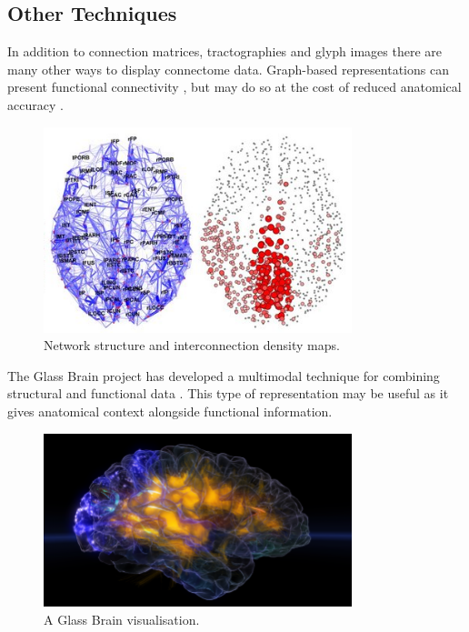 \documentclass[MSc,paper=a4,pagesize=auto]{icldt}
\begin{document}
\subsection{Other Techniques}
In addition to connection matrices, tractographies and glyph images there are many other ways to display connectome data. Graph-based representations can present functional connectivity \cite{Hagmann2008}, but may do so at the cost of reduced anatomical accuracy \cite{Margulies2013}. 

\begin{figure}[htbp!]
    \centering
    \includegraphics[width=0.8\textwidth]{resources/connectome_graphs}
    \caption{Network structure and interconnection density maps. \cite{Hagmann2005}}
    \label{fig:connectome_graphs}
\end{figure}

The Glass Brain project has developed a multimodal technique for combining structural and functional data \cite{GlassBrain2014}. This type of representation may be useful as it gives anatomical context alongside functional information. 

\begin{figure}[htbp!]
    \centering
    \includegraphics[width=0.8\textwidth]{resources/glass_brain}
    \caption{A Glass Brain visualisation. \cite{GlassBrain2014}}
    \label{fig:glass_brain}
\end{figure}
\end{document}
